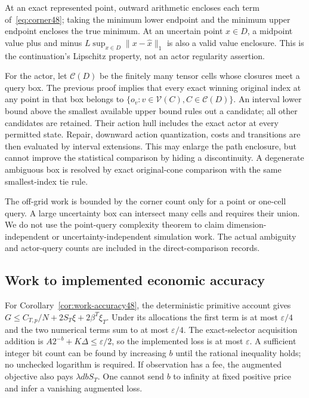 At an exact represented point, outward arithmetic encloses each term of~\eqref{eq:corner48}; taking the minimum lower endpoint and the minimum upper endpoint encloses the true minimum. At an uncertain point $x\in D$, a midpoint value plus and minus $L\sup_{x\in D}\|x-\widehat x\|_1$ is also a valid value enclosure. This is the continuation's Lipschitz property, not an actor regularity assertion.

For the actor, let $\mathcal C(D)$ be the finitely many tensor cells whose closures meet a query box. The previous proof implies that every exact winning original index at any point in that box belongs to $\{o_v:v\in\mathcal V(C),C\in\mathcal C(D)\}$. An interval lower bound above the smallest available upper bound rules out a candidate; all other candidates are retained. Their action hull includes the exact actor at every permitted state. Repair, downward action quantization, costs and transitions are then evaluated by interval extensions. This may enlarge the path enclosure, but cannot improve the statistical comparison by hiding a discontinuity. A degenerate ambiguous box is resolved by exact original-cone comparison with the same smallest-index tie rule.

The off-grid work is bounded by the corner count only for a point or one-cell query. A large uncertainty box can intersect many cells and requires their union. We do not use the point-query complexity theorem to claim dimension-independent or uncertainty-independent simulation work. The actual ambiguity and actor-query counts are included in the direct-comparison records.


\subsection{Work to implemented economic accuracy}
For Corollary~\ref{cor:work-accuracy48}, the deterministic primitive account gives $G\le C_{T,p}/N+2S_T\xi+2\beta^T\xi_T$. Under its allocations the first term is at most $\varepsilon/4$ and the two numerical terms sum to at most $\varepsilon/4$. The exact-selector acquisition addition is $A2^{-b}+K\Delta\le\varepsilon/2$, so the implemented loss is at most $\varepsilon$. A sufficient integer bit count can be found by increasing $b$ until the rational inequality holds; no unchecked logarithm is required. If observation has a fee, the augmented objective also pays $\lambda dbS_T$. One cannot send $b$ to infinity at fixed positive price and infer a vanishing augmented loss.

